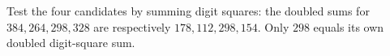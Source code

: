 Test the four candidates by summing digit squares: the doubled sums for $384,264,298,328$ are respectively $178,112,298,154$. Only $\boxed{298}$ equals its own doubled digit-square sum.
